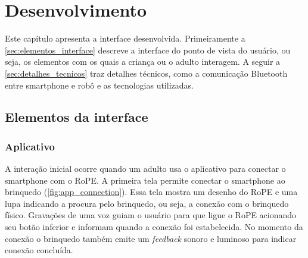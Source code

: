 \chapter{Desenvolvimento}
\label{c_desenvolvimento}

Este capítulo apresenta a interface desenvolvida. Primeiramente a \autoref{sec:elementos_interface} descreve a interface do ponto de vista do usuário, ou seja, os elementos com os quais a criança ou o adulto interagem. A seguir a \autoref{sec:detalhes_tecnicos} traz detalhes técnicos, como a comunicação Bluetooth entre smartphone e robô e as tecnologias utilizadas.

\section{Elementos da interface}
\label{sec:elementos_interface}
\subsection{Aplicativo}
A interação inicial ocorre quando um adulto usa o aplicativo para conectar o smartphone com o RoPE. A primeira tela permite conectar o smartphone ao brinquedo (\autoref{fig:app_connection}). Essa tela mostra um desenho do RoPE e uma lupa indicando a procura pelo brinquedo, ou seja, a conexão com o brinquedo físico. Gravações de uma voz guiam o usuário para que ligue o RoPE acionando seu botão inferior e informam quando a conexão foi estabelecida. No momento da conexão o brinquedo também emite um \textit{feedback} sonoro e luminoso para indicar conexão concluída.

